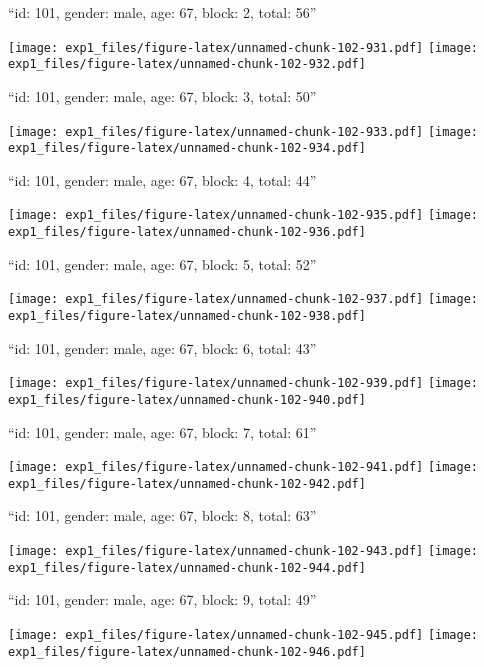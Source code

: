 \documentclass[11pt,,]{article}
\begin{document}
\newpage
[1] 

``id: 101, gender: male, age: 67, block: 2, total: 56''

\texttt{[image: exp1\_files/figure-latex/unnamed-chunk-102-931.pdf]}
\texttt{[image: exp1\_files/figure-latex/unnamed-chunk-102-932.pdf]}

\newpage
[1] 

``id: 101, gender: male, age: 67, block: 3, total: 50''

\texttt{[image: exp1\_files/figure-latex/unnamed-chunk-102-933.pdf]}
\texttt{[image: exp1\_files/figure-latex/unnamed-chunk-102-934.pdf]}

\newpage
[1] 

``id: 101, gender: male, age: 67, block: 4, total: 44''

\texttt{[image: exp1\_files/figure-latex/unnamed-chunk-102-935.pdf]}
\texttt{[image: exp1\_files/figure-latex/unnamed-chunk-102-936.pdf]}

\newpage
[1] 

``id: 101, gender: male, age: 67, block: 5, total: 52''

\texttt{[image: exp1\_files/figure-latex/unnamed-chunk-102-937.pdf]}
\texttt{[image: exp1\_files/figure-latex/unnamed-chunk-102-938.pdf]}

\newpage
[1] 

``id: 101, gender: male, age: 67, block: 6, total: 43''

\texttt{[image: exp1\_files/figure-latex/unnamed-chunk-102-939.pdf]}
\texttt{[image: exp1\_files/figure-latex/unnamed-chunk-102-940.pdf]}

\newpage
[1] 

``id: 101, gender: male, age: 67, block: 7, total: 61''

\texttt{[image: exp1\_files/figure-latex/unnamed-chunk-102-941.pdf]}
\texttt{[image: exp1\_files/figure-latex/unnamed-chunk-102-942.pdf]}

\newpage
[1] 

``id: 101, gender: male, age: 67, block: 8, total: 63''

\texttt{[image: exp1\_files/figure-latex/unnamed-chunk-102-943.pdf]}
\texttt{[image: exp1\_files/figure-latex/unnamed-chunk-102-944.pdf]}

\newpage
[1] 

``id: 101, gender: male, age: 67, block: 9, total: 49''

\texttt{[image: exp1\_files/figure-latex/unnamed-chunk-102-945.pdf]}
\texttt{[image: exp1\_files/figure-latex/unnamed-chunk-102-946.pdf]}
\end{document}
